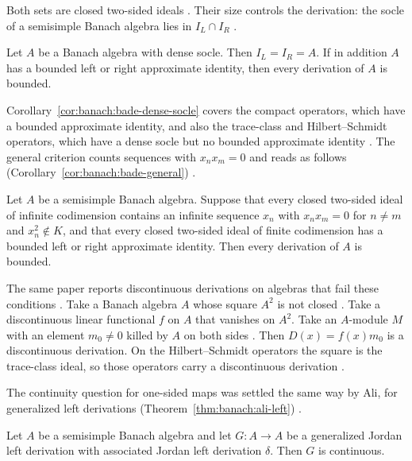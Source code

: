 Both sets are closed two-sided ideals \cite[Theorem~2.3,
p.~375]{BadeCurtis1974}. Their size controls the derivation: the socle of a
semisimple Banach algebra lies in $I_L\cap I_R$ \cite[Theorem~2.7,
pp.~378--379]{BadeCurtis1974}.

\begin{corollary}\label{cor:banach:bade-dense-socle}
Let $A$ be a Banach algebra with dense socle. Then $I_L=I_R=A$. If in addition
$A$ has a bounded left or right approximate identity, then every derivation of
$A$ is bounded.
\end{corollary}

Corollary~\ref{cor:banach:bade-dense-socle} covers the compact operators,
which have a bounded approximate identity, and also the trace-class and
Hilbert--Schmidt operators, which have a dense socle but no bounded approximate
identity \cite[p.~379]{BadeCurtis1974}. The general criterion counts
sequences with $x_nx_m=0$ and reads as follows (Corollary~\ref{cor:banach:bade-general})
\cite[Corollary~2.6, p.~378]{BadeCurtis1974}.\begin{corollary}\label{cor:banach:bade-general}
Let $A$ be a semisimple Banach algebra. Suppose that every closed two-sided
ideal of infinite codimension contains an infinite sequence $x_n$ with
$x_nx_m=0$ for $n\neq m$ and $x_n^2\notin K$, and that every closed two-sided
ideal of finite codimension has a bounded left or right approximate identity.
Then every derivation of $A$ is bounded.
\end{corollary}

The same paper reports discontinuous derivations on algebras that fail these
conditions \cite[p.~375]{BadeCurtis1974}. Take a Banach algebra $A$ whose
square $A^2$ is not closed
\cite[p.~375]{BadeCurtis1974}. Take a discontinuous linear functional $f$ on
$A$ that vanishes on $A^2$. Take an $A$-module $M$ with an element
$m_0\neq0$ killed by $A$ on both sides
\cite[p.~375]{BadeCurtis1974}. Then $D(x)=f(x)m_0$ is a discontinuous
derivation. On the Hilbert--Schmidt operators the square is the trace-class
ideal, so those operators carry a discontinuous derivation
\cite[p.~375]{BadeCurtis1974}.

The continuity question for one-sided maps was settled the same way by Ali,
for generalized left derivations (Theorem~\ref{thm:banach:ali-left})
\cite[p.~209]{Ali2011GeneralizedLeft}.

\begin{theorem}\label{thm:banach:ali-left}
Let $A$ be a semisimple Banach algebra and let $G\colon A\to A$ be a
generalized Jordan left derivation with associated Jordan left derivation
$\delta$. Then $G$ is continuous.
\end{theorem}

